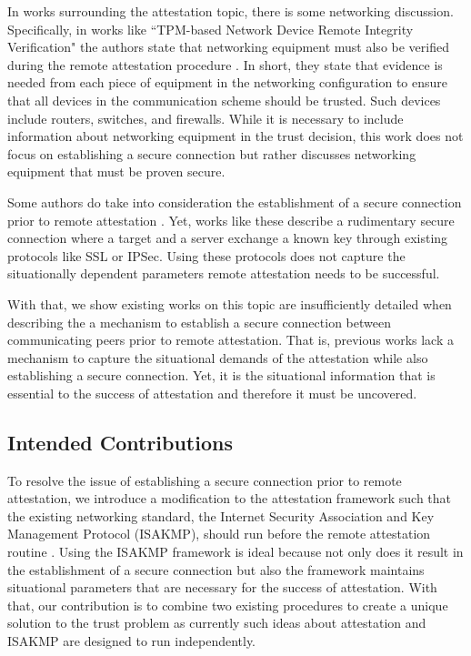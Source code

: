 \documentclass[12pt, letterpaper, twoside]{article}
\begin{document}
In works surrounding the attestation topic, there is some networking discussion. Specifically, in works like ``TPM-based Network Device Remote Integrity Verification" the authors state that networking equipment must also be verified during the remote attestation procedure \cite{ietf-rats}. In short, they state that evidence is needed from each piece of equipment in the networking configuration to ensure that all devices in the communication scheme should be trusted. Such devices include routers, switches, and firewalls. While it is necessary to include information about networking equipment in the trust decision, this work does not focus on establishing a secure connection but rather discusses networking equipment that must be proven secure.  

Some authors do take into consideration the establishment of a secure connection prior to remote attestation \cite{linking_remote}. Yet, works like these describe a rudimentary secure connection where a target and a server exchange a known key through existing protocols like SSL or IPSec. Using these protocols does not capture the situationally dependent parameters remote attestation needs to be successful. 

With that, we show existing works on this topic are insufficiently detailed when describing the a mechanism to establish a secure connection between communicating peers prior to remote attestation. That is, previous works lack a mechanism to capture the situational demands of the attestation while also establishing a secure connection. Yet, it is the situational information that is essential to the success of attestation and therefore it must be uncovered. 

\subsection*{Intended Contributions}

To resolve the issue of establishing a secure connection prior to remote attestation, we introduce a modification to the attestation framework such that the existing networking standard, the Internet Security Association and Key Management Protocol (ISAKMP), should run before the remote attestation routine \cite{ISAKMP, prin_remote}. Using the ISAKMP framework is ideal because not only does it result in the establishment of a secure connection but also the framework maintains situational parameters that are necessary for the success of attestation. With that, our contribution is to combine two existing procedures to create a unique solution to the trust problem as currently such ideas about attestation and ISAKMP are designed to run independently. 
\end{document}
